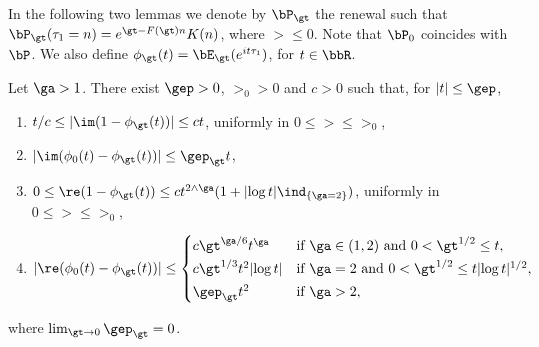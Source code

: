 In the following two lemmas we denote by $\bP_\gt$ the renewal such that $\bP_\gt(\tau_1 = n) =\linebreak e^{\gt - F(\gt) n} K(n)$, where $\gt\le 0$. Note that $\bP_0$ coincides with $\bP$. We also define $\phi_\gt(t) = \bE_\gt(e^{i t \tau_1})$, for $t\in\bbR$.

\begin{lemm}\label{lem:UnifEstimatesCFs}
Let $\ga > 1$. There exist $\gep>0$, $\gt_0>0$ and $c>0$ such that, for $|t| \le \gep$,
\begin{enumerate}
\item \label{A.9.1} $t/c \le \mathopen{|}\im(1- \phi_\gt(t))| \le ct$, uniformly in $0 \le \gt \le \gt_0$,
\item \label{A.9.2} $\mathopen{|}\im(\phi_0(t) -\phi_\gt(t))| \le \gep_\gt t$,
\item \label{A.9.3} $0 \le \re(1- \phi_\gt(t)) \le ct^{2\wedge \ga}{(1+ \mathopen{|}\log t|\ind_{\{\ga = 2\}})}$, uniformly in $0\le \gt \le \gt_0$,
\item \label{A.9.4} $\mathopen{|}\re(\phi_0(t) -\phi_\gt(t))| \le
\begin{cases}
c \gt^{\ga / 6} t^\ga& \text{if } \ga\in(1,2) \text{ and } 0 < \gt^{1/2} \le t,\\[2pt] { c \gt^{1/3} t^2 \mathopen{|}\log t|} & \text{if } \ga=2 \text{ and } 0 < \gt^{1/2} \le t\mathopen{|}\log t|^{1/2},\\[2pt]
\gep_\gt t^2& \text{if } \ga> 2,
\end{cases}$
\end{enumerate}
where $\lim_{\gt\to 0} \gep_\gt = 0$.
\end{lemm}

